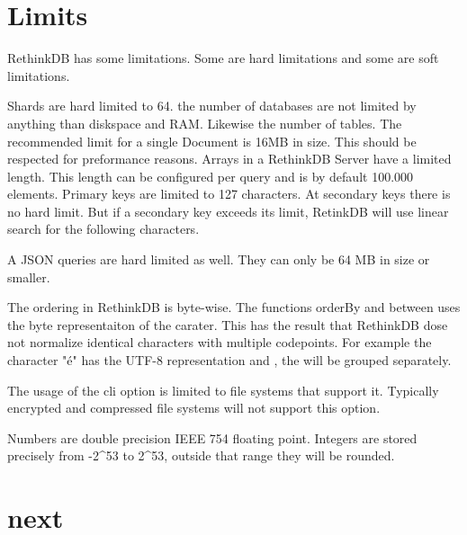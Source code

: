 \section{Limits}


RethinkDB has some limitations. 
Some are hard limitations and some are soft limitations.
\cite{RethinkLimits}

Shards are hard limited to 64.
the number of databases are not limited by anything than diskspace and RAM.
Likewise the number of tables.
The recommended limit for a single Document is 16MB in size.
This should be respected for preformance reasons.
Arrays in a RethinkDB Server have a limited length.
This length can be configured per query and is by default 100.000 elements.
Primary keys are limited to 127 characters.
At secondary keys there is no hard limit.
But if a secondary key exceeds its limit, RetinkDB will use linear search for the following characters.

A JSON queries are hard limited as well.
They can only be 64 MB in size or smaller.

The ordering in RethinkDB is byte-wise.
The functions orderBy and between uses the byte representaiton of the carater.
This has the result that RethinkDB dose not normalize identical characters with multiple codepoints.
For example the character "é" has the UTF-8 representation  and , the will be grouped separately.

The usage of the cli option  is limited to file systems that support it.
Typically encrypted and compressed file systems will not support this option.

Numbers are double precision IEEE 754 floating point.
Integers are stored precisely from -2^53 to 2^53, outside that range they will be rounded.
\section{next}
